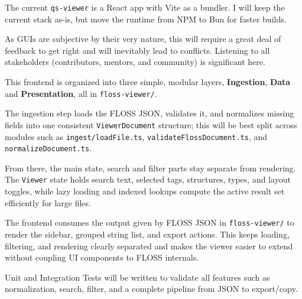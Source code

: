 \documentclass[12pt]{article}
\begin{document}
The current \texttt{qs-viewer} is a React app with Vite as a bundler. I will keep the current stack as-is, but move the runtime from NPM to Bun for faster builds.

As GUIs are subjective by their very nature, this will require a great deal of feedback to get right and will inevitably lead to conflicts. Listening to all stakeholders (contributors, mentors, and community) is significant here.

This frontend is organized into three simple, modular layers, \textbf{Ingestion}, \textbf{Data} and \textbf{Presentation}, all in \texttt{floss-viewer/}.

The ingestion step loads the FLOSS JSON, validates it, and normalizes missing fields into one consistent \texttt{ViewerDocument} structure; this will be best split across modules such as \texttt{ingest/loadFile.ts}, \texttt{validateFlossDocument.ts}, and \texttt{normalizeDocument.ts}.

From there, the main state, search and filter parts stay separate from rendering. The \texttt{Viewer} state holds search text, selected tags, structures, types, and layout toggles, while lazy loading and indexed lookups compute the active result set efficiently for large files.

The frontend consumes the output given by FLOSS JSON in \texttt{floss-viewer/} to render the sidebar, grouped string list, and export actions. This keeps loading, filtering, and rendering clearly separated and makes the viewer easier to extend without coupling UI components to FLOSS internals.

Unit and Integration Tests will be written to validate all features such as normalization, search, filter, and a complete pipeline from JSON to export/copy.
\end{document}
